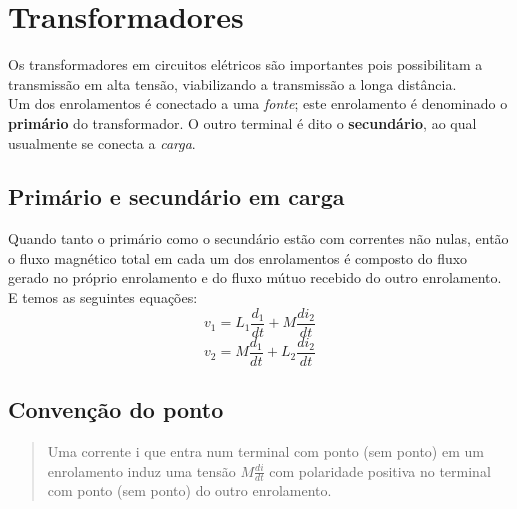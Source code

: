 \documentclass[a4paper, 12pt]{article}
\begin{document}
\section{Transformadores}
Os transformadores em circuitos elétricos são importantes pois possibilitam a transmissão em alta tensão, viabilizando a transmissão a longa distância.\\

Um dos enrolamentos é conectado a uma \textit{fonte}; este enrolamento é denominado o \textbf{primário} do transformador. O outro terminal é dito o \textbf{secundário}, ao qual usualmente se conecta a \textit{carga}.
	\subsection{Primário e secundário em carga}
		Quando tanto o primário como o secundário estão com correntes não nulas, então o fluxo magnético total em cada um dos enrolamentos é composto do fluxo gerado no próprio enrolamento e do fluxo mútuo recebido do outro enrolamento. E temos as seguintes equações:
		\begin{equation}
			v_1 = L_1\frac{d_1}{dt} + M\frac{di_2}{dt}
		\end{equation}
		\begin{equation}
			v_2 = M\frac{d_1}{dt} + L_2\frac{di_2}{dt}
		\end{equation}
		
		\subsection{Convenção do ponto}
		\begin{quote}
			Uma corrente i que entra num terminal com ponto (sem ponto) em um enrolamento induz uma tensão $M\frac{di}{dt}$ com polaridade positiva no terminal com ponto (sem ponto)
do outro enrolamento.
		\end{quote}
		
\end{document}
